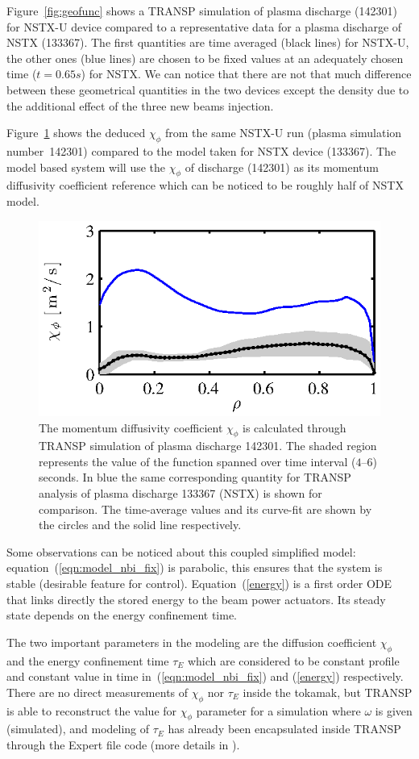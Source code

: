 \documentclass[12pt,lot, lof]{puthesis}
\begin{document}
Figure~{\ref{fig:geofunc}} shows a TRANSP simulation of plasma discharge (142301) for NSTX-U device compared to a representative data for a plasma discharge of NSTX (133367). The first quantities are time averaged (black lines) for NSTX-U, the other ones (blue lines) are chosen to be fixed values at an adequately chosen time ($t = 0.65 s$) for NSTX. We can notice that there are not that much difference between these geometrical quantities in the two devices except the density due to the additional effect of the three new beams injection. 

Figure~{\ref{fig:chiphi}} shows the deduced $\chi_\phi$ from the same NSTX-U run (plasma simulation number~142301) compared to the model taken for NSTX device (133367). The model based system will use the $\chi_\phi$ of discharge (142301) as its momentum diffusivity coefficient reference which can be noticed to be roughly half of NSTX model.

\begin{figure}
\centering
\includegraphics [width=0.7\linewidth]{chap10/fig2_fr}
\caption{The momentum diffusivity coefficient $ \chi_{\phi}$ is calculated through TRANSP simulation of plasma discharge 142301.  The shaded region represents the value of the function spanned over time interval ($4$--$6$) seconds. In blue the same corresponding quantity for TRANSP analysis of plasma discharge 133367 (NSTX) is shown for comparison. The time-average values and its curve-fit are shown by the circles  and the solid line respectively.}
\label{fig:chiphi}
\end{figure}

Some observations can be noticed about this coupled simplified model: equation~(\ref{eqn:model_nbi_fix}) is parabolic, this ensures that the system is stable (desirable feature for control). Equation~(\ref{energy}) is a first order ODE that links directly the stored energy to the beam power actuators. Its steady state depends on the energy confinement time.
  
The two important parameters in the modeling are the diffusion coefficient $\chi_\phi$ and the energy confinement time $\tau_E$ which are considered to be constant profile and constant value in time in~(\ref{eqn:model_nbi_fix}) and (\ref{energy}) respectively. There are no direct measurements of $\chi_\phi$ nor  $\tau_E$ inside the tokamak, but TRANSP is able to reconstruct the value for $\chi_\phi$ parameter for a simulation where $\omega$
is given (simulated), and modeling of $\tau_E$ has already been encapsulated inside TRANSP through the Expert file code (more details in \cite{Boyer15}).
\end{document}
